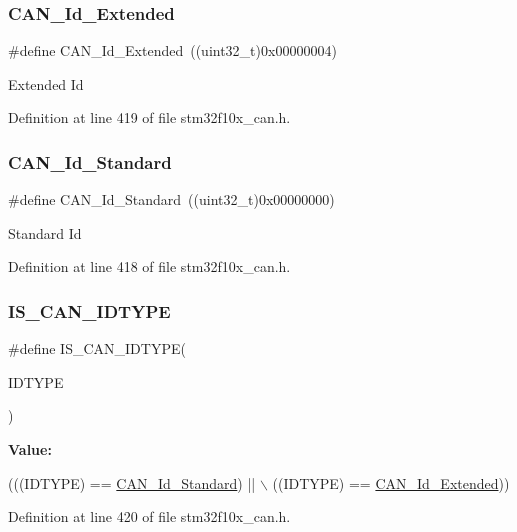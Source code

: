 \subsubsection{\texorpdfstring{C\+A\+N\+\_\+\+Id\+\_\+\+Extended}{CAN\_Id\_Extended}}
{\footnotesize\ttfamily \#define C\+A\+N\+\_\+\+Id\+\_\+\+Extended~((uint32\+\_\+t)0x00000004)}

Extended Id 

Definition at line 419 of file stm32f10x\+\_\+can.\+h.

\mbox{\label{group___c_a_n__identifier__type_ga151d9df8a6f361d0a3231593726b5a13}} 
\subsubsection{\texorpdfstring{C\+A\+N\+\_\+\+Id\+\_\+\+Standard}{CAN\_Id\_Standard}}
{\footnotesize\ttfamily \#define C\+A\+N\+\_\+\+Id\+\_\+\+Standard~((uint32\+\_\+t)0x00000000)}

Standard Id 

Definition at line 418 of file stm32f10x\+\_\+can.\+h.

\mbox{\label{group___c_a_n__identifier__type_gab845f7fbcf6ff8cf3d025210eb8900e4}} 
\subsubsection{\texorpdfstring{I\+S\+\_\+\+C\+A\+N\+\_\+\+I\+D\+T\+Y\+PE}{IS\_CAN\_IDTYPE}}
{\footnotesize\ttfamily \#define I\+S\+\_\+\+C\+A\+N\+\_\+\+I\+D\+T\+Y\+PE(\begin{DoxyParamCaption}\item[{}]{I\+D\+T\+Y\+PE }\end{DoxyParamCaption})}

{\bfseries Value\+:}
\begin{DoxyCode}
(((IDTYPE) == \hyperlink{group___c_a_n__identifier__type_ga151d9df8a6f361d0a3231593726b5a13}{CAN\_Id\_Standard}) || \(\backslash\)
                               ((IDTYPE) == \hyperlink{group___c_a_n__identifier__type_gaf6c5c0b43b968fed17fd90246912b1a7}{CAN\_Id\_Extended}))
\end{DoxyCode}


Definition at line 420 of file stm32f10x\+\_\+can.\+h.

